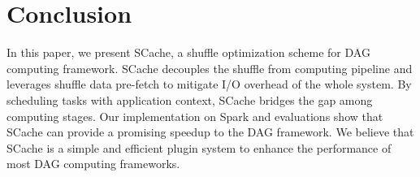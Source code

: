 \section{Conclusion}
 In this paper, we present SCache, a shuffle optimization scheme for DAG computing framework. SCache decouples the shuffle from computing pipeline and leverages shuffle data pre-fetch to mitigate I/O overhead of the whole system. By scheduling tasks with application context, SCache bridges the gap among computing stages. Our implementation on Spark and evaluations show that SCache can provide a promising speedup to the DAG framework. We believe that SCache is a simple and efficient plugin system to enhance the performance of most DAG computing frameworks.